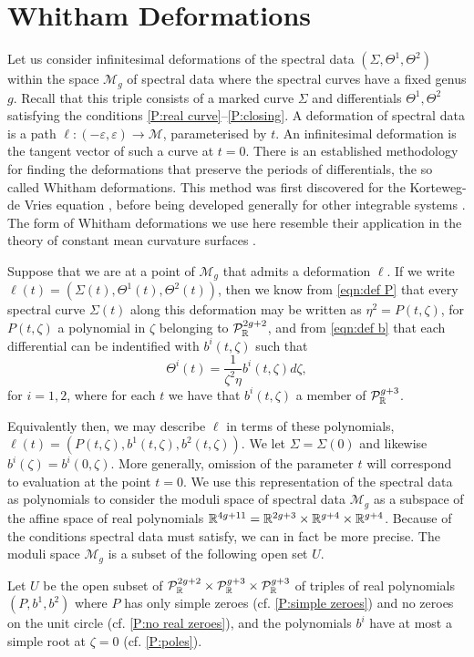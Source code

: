 \section{Whitham Deformations}
Let us consider infinitesimal deformations of the spectral data $(Σ,Θ^1,Θ^2)$ within the space $\mathcal{M}_g$ of spectral data where the spectral curves have a fixed genus $g$. Recall that this triple consists of a marked curve $Σ$ and differentials $Θ^1, Θ^2$ satisfying the conditions \ref{P:real curve}--\ref{P:closing}.
A deformation of spectral data is a path $\ell:(-ε,ε) \to \mathcal{M}$, parameterised by $t$. An infinitesimal deformation is the tangent vector of such a curve at $t=0$.
There is an established methodology for finding the deformations that preserve the periods of differentials, the so called Whitham deformations. This method was first discovered for the Korteweg-de Vries equation \cite{Flaschka1980,Lax1983}, before being developed generally for other integrable systems \cite{Krichever1995}. The form of Whitham deformations we use here resemble their application in the theory of constant mean curvature surfaces \cite{Kilian2015a,Carberry2016}.

Suppose that we are at a point of $\mathcal{M}_g$ that admits a deformation $\ell$. If we write $\ell(t) = (Σ(t),Θ^1(t),Θ^2(t))$, then we know from \eqref{eqn:def P} that every spectral curve $Σ(t)$ along this deformation may be written as $η^2 = P(t,ζ)$, for $P(t,ζ)$ a polynomial in $ζ$ belonging to $\mathcal{P}^{2g+2}_\R$, and from \eqref{eqn:def b} that each differential can be indentified with $b^i(t,ζ)$ such that
\[
Θ^i(t) = \frac{1}{ζ^2η}b^i(t,ζ) dζ,
\]
for $i=1,2$, where for each $t$ we have that $b^i(t,ζ)$ a member of $\mathcal{P}^{g+3}_\R$.

Equivalently then, we may describe $\ell$ in terms of these polynomials, $\ell(t) = (P(t,ζ),b^1(t,ζ),b^2(t,ζ))$.
We let $Σ = Σ(0)$ and likewise $b^i(ζ) = b^i(0,ζ)$.
More generally, omission of the parameter $t$ will correspond to evaluation at the point $t=0$. We use this representation of the spectral data as polynomials to consider the moduli space of spectral data $\mathcal{M}_g$ as a subspace of the affine space of real polynomials $\R^{4g+11} = \R^{2g+3}\times\R^{g+4}\times\R^{g+4}$. Because of the conditions spectral data must satisfy, we can in fact be more precise. The moduli space $\mathcal{M}_g$ is a subset of the following open set $U$.

\begin{defn}
\label{def:def U}
Let $U$ be the open subset of $\mathcal{P}^{2g+2}_\R\times \mathcal{P}^{g+3}_\R\times\mathcal{P}^{g+3}_\R$ of triples of real polynomials $(P,b^1,b^2)$ where
$P$ has only simple zeroes (cf. \ref{P:simple zeroes}) and no zeroes on the unit circle (cf. \ref{P:no real zeroes}), and the polynomials $b^i$ have at most a simple root at $ζ=0$ (cf. \ref{P:poles}).
\end{defn}

